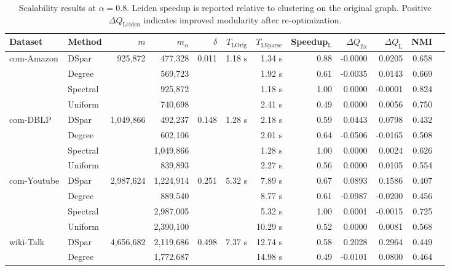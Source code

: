\documentclass[10pt,journal,compsoc]{IEEEtran}
\begin{document}
\begin{table}[t]
\centering
\caption{Scalability results at $\alpha=0.8$.
Leiden speedup is reported relative to clustering on the original graph.
Positive $\Delta Q_{\mathrm{Leiden}}$ indicates improved modularity after re-optimization.}
\label{tab:scalability_alpha08}
\begin{tabular}{llrrrrrrrrrr}
\toprule
Dataset & Method & $m$ & $m_\alpha$ & $\delta$ & $T_{\mathrm{LOrig}}$ & $T_{\mathrm{LSparse}}$ & Speedup$_{\mathrm{L}}$ & $\Delta Q_{\mathrm{fix}}$ & $\Delta Q_{\mathrm{L}}$ & NMI \\
\midrule
com-Amazon\cite{yang2012defining}
 & DSpar    & 925,872 & 477,328 & 0.011 & 1.18 s & 1.34 s & 0.88 & -0.0000 & 0.0205 & 0.658 \\
 & Degree   &         & 569,723 &  &        & 1.92 s & 0.61 & -0.0035 & 0.0143 & 0.669 \\
 & Spectral &         & 925,872 &  &        & 1.18 s & 1.00 & 0.0000 & -0.0001 & 0.824 \\
 & Uniform  &         & 740,698 &  &        & 2.41 s & 0.49 & 0.0000 & 0.0056 & 0.750 \\
\midrule
com-DBLP\cite{yang2012defining}
 & DSpar    & 1,049,866 & 492,237 & 0.148 & 1.28 s & 2.18 s & 0.59 & 0.0443 & 0.0798 & 0.432 \\
 & Degree   &           & 602,106 &  &        & 2.01 s & 0.64 & -0.0506 & -0.0165 & 0.508 \\
 & Spectral &           & 1,049,866 &  &        & 1.28 s & 1.00 & 0.0000 & 0.0024 & 0.626 \\
 & Uniform  &           & 839,893 &  &        & 2.27 s & 0.56 & 0.0000 & 0.0105 & 0.554 \\
\midrule
com-Youtube\cite{yang2012defining}
 & DSpar    & 2,987,624 & 1,224,914 & 0.251 & 5.32 s & 7.89 s & 0.67 & 0.0893 & 0.1586 & 0.407 \\
 & Degree   &           & 889,540   &  &        & 8.77 s & 0.61 & -0.0987 & -0.0200 & 0.456 \\
 & Spectral &           & 2,987,005 &  &        & 5.32 s & 1.00 & 0.0001 & -0.0015 & 0.725 \\
 & Uniform  &           & 2,390,100 &  &        & 10.29 s & 0.52 & 0.0000 & 0.0081 & 0.568 \\
\midrule
wiki-Talk\cite{leskovec2010signed}
 & DSpar    & 4,656,682 & 2,119,686 & 0.498 & 7.37 s & 12.74 s & 0.58 & 0.2028 & 0.2964 & 0.449 \\
 & Degree   &           & 1,772,687 &  &        & 14.98 s & 0.49 & -0.0101 & 0.0800 & 0.464 \\

\end{tabular}
\end{table}
\end{document}
